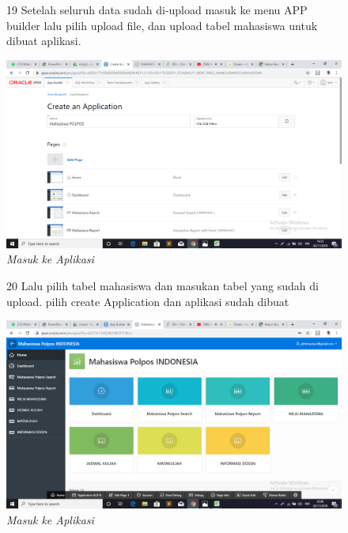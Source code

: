 \begin{enumerate}
\begin{figure}
\item[19]Setelah seluruh data sudah di-upload masuk ke menu APP builder lalu pilih upload file, dan upload tabel mahasiswa untuk dibuat aplikasi.
    \begin{center}
\includegraphics[scale=0.4]{apex/a11.png}
    \caption{\textit{Masuk ke Aplikasi}}
        \end{center}
\label{gambar}
\end{figure}

\begin{figure}
\item[20]Lalu pilih tabel mahasiswa dan masukan tabel yang sudah di upload. pilih create Application dan aplikasi sudah dibuat
    \begin{center}
\includegraphics[scale=0.4]{apex/a12.png}
    \caption{\textit{Masuk ke Aplikasi}}
        \end{center}
\label{gambar}
\end{figure}

\end{enumerate}

